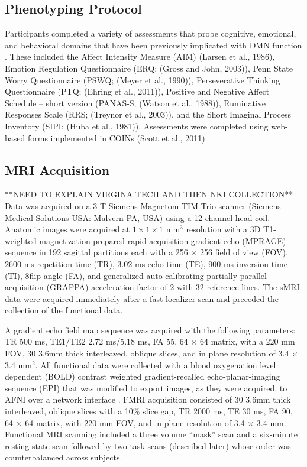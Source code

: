 \subsection{Phenotyping Protocol}
Participants completed a variety of assessments that probe cognitive, emotional, and behavioral domains that have been previously implicated with DMN function \cite{Andrews_Hanna2014,Buckner2008,Hamilton2011,Sheline2009}. These included the Affect Intensity Measure (AIM) (Larsen et al., 1986), Emotion Regulation Questionnaire (ERQ; (Gross and John, 2003)), Penn State Worry Questionnaire (PSWQ; (Meyer et al., 1990)), Perseverative Thinking Questionnaire (PTQ; (Ehring et al., 2011)), Positive and Negative Affect Schedule -- short version (PANAS-S; (Watson et al., 1988)), Ruminative Responses Scale (RRS; (Treynor et al., 2003)), and the Short Imaginal Process Inventory (SIPI; (Huba et al., 1981)). Assessments were completed using web-based forms implemented in COINs (Scott et al., 2011). 

\subsection{MRI Acquisition}
**NEED TO EXPLAIN VIRGINA TECH AND THEN NKI COLLECTION**
Data was acquired on a 3 T Siemens Magnetom TIM Trio scanner (Siemens Medical Solutions USA: Malvern PA, USA) using a 12-channel head coil. Anatomic images were acquired at $1 \times 1 \times 1$ mm$^{3}$ resolution with a 3D T1-weighted magnetization-prepared rapid acquisition gradient-echo (MPRAGE) sequence \cite{Mugler_1990} in 192 sagittal partitions each with a 256 $\times$ 256 field of view (FOV), 2600 ms repetition time (TR), 3.02 ms echo time (TE), 900 ms inversion time (TI), 8\textdegree flip angle (FA), and generalized auto-calibrating partially parallel acquisition (GRAPPA) \cite{Griswold_2002} acceleration factor of 2 with 32 reference lines. The sMRI data were acquired immediately after a fast localizer scan and preceded the collection of the functional data. 

A gradient echo field map sequence was acquired with the following parameters: TR 500 ms, TE1/TE2 2.72 ms/5.18 ms, FA 55\textdegree, 64 $\times$ 64 matrix, with a 220 mm FOV, 30 3.6mm thick interleaved, oblique slices, and in plane resolution of 3.4 $\times$ 3.4 mm$^{2}$. All functional data were collected with a blood oxygenation level dependent (BOLD) contrast weighted gradient-recalled echo-planar-imaging sequence (EPI) that was modified to export images, as they were acquired, to AFNI over a network interface \cite{Cox_1995,Cox_1996,LaConte_2007}. FMRI acquisition consisted of 30 3.6mm thick interleaved, oblique slices with a 10\% slice gap, TR 2000 ms, TE 30 ms, FA 90\textdegree, 64 $\times$ 64 matrix, with 220 mm FOV, and in plane resolution of 3.4 $\times$ 3.4 mm. Functional MRI scanning included a three volume ``mask'' scan and a six-minute resting state scan followed by two task scans (described later) whose order was counterbalanced across subjects.

